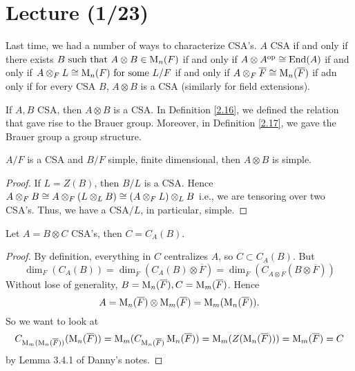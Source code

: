 \section{Lecture (1/23)}
Last time, we had a number of ways to characterize CSA's. $A$ CSA if and only if there exists $B \text{ such that } A\otimes B \in \operatorname{M}_n(F)$ if and only if $A \otimes A^{\operatorname{op}} \cong \operatorname{End}(A)$ if and only if $A \otimes_F L \cong \operatorname{M}_n(F) \text{ for some } L/F$ if and only if $A\otimes_F \overline{F} \cong \operatorname{M}_n(\overline{F})$ if adn only if for every CSA $B$, $A\otimes B$ is a CSA (similarly for field extensions).

If $A,B$ CSA, then $A\otimes B$ is a CSA. In Definition \ref{2.16}, we defined the relation that gave rise to the Brauer group. Moreover, in Definition \ref{2.17}, we gave the Brauer group a group structure. 

\begin{lemma}\label{3.1}
$A/F$ is a CSA and $B/F$ simple, finite dimensional, then $A\otimes B$ is simple.
\end{lemma}

\begin{proof}
If $L = Z(B)$, then $B/L$ is a CSA. Hence $A\otimes_F B \cong A\otimes_F(L\otimes_L B) \cong (A\otimes_F L)\otimes_L B$ i.e., we are tensoring over two CSA's. Thus, we have a CSA$/L$, in particular, simple.
\end{proof}

\begin{lemma}\label{3.2}
Let $A = B\otimes C$ CSA's, then $C = C_A(B).$
\end{lemma}

\begin{proof}
By definition, everything in $C$ centralizes $A$, so $C \subset C_A(B).$ But $$\dim_F(C_A(B)) = \dim_{\overline{F}}(C_A(B) \otimes \overline{F}) = \dim_{\overline{F}}(C_{A\otimes \overline{F}}(B\otimes \overline{F}))$$
Without lose of generality, $B = \operatorname{M}_n(\overline{F}), C = \operatorname{M}_m(\overline{F})$. Hence 
$$A = \operatorname{M}_n(\overline{F}) \otimes \operatorname{M}_m(\overline{F}) = \operatorname{M}_m(\operatorname{M}_n(\overline{F})).$$
So we want to look at $$C_{\operatorname{M}_m(\operatorname{M}_n(\overline{F}))}(\operatorname{M}_n(\overline{F})) = \operatorname{M}_m(C_{\operatorname{M}_n(\overline{F})}\operatorname{M}_n(\overline{F})) = \operatorname{M}_m(Z(\operatorname{M}_n(\overline{F}))) = \operatorname{M}_m(\overline{F}) = C$$ by Lemma 3.4.1 of Danny's notes.

\end{proof}

